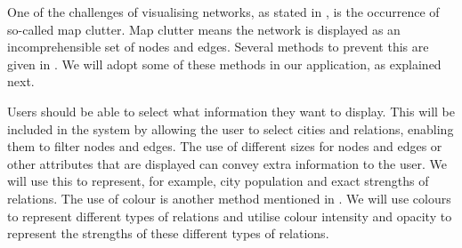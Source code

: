 One of the challenges of visualising networks, as stated in \cite{468391}, is the occurrence of so-called map clutter. Map clutter means the network is displayed as an incomprehensible set of nodes and edges.
Several methods to prevent this are given in \cite{468391}. We will adopt some of these methods in our application, as explained next.

Users should be able to select what information they want to display. This will be included in the system by allowing the user to select cities and relations, enabling them to filter nodes and edges. The use of different sizes for nodes and edges or other attributes that are displayed can convey extra information to the user. We will use this to represent, for example, city population and exact strengths of relations.
The use of colour is another method mentioned in \cite{468391}. We will use colours to represent different types of relations and utilise colour intensity and opacity to represent the strengths of these different types of relations.